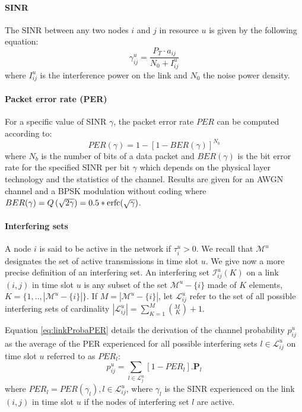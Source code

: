 \documentclass[a4paper]{article}
\newcommand{\power}{P_T}
\newcommand{\M}{\mathcal{M}}
\begin{document}
\paragraph*{SINR}
The SINR between any two nodes $i$ and $j$ in resource $u$ is given by the following equation:
\begin{equation}
\gamma_{ij}^u=\displaystyle{\frac{\power \cdot a_{ij}}{N_0+I_{ij}^u}}
\label{eq:sinr}
\end{equation}
where $I_{ij}^u$ is the interference power on the link and $N_0$ the noise power density.

\paragraph*{Packet error rate (PER)}
For a specific value of SINR $\gamma$, the packet error rate $PER$ can be computed according to:
\begin{equation}
PER(\gamma) = 1-\left[1-BER(\gamma)\right]^{N_b} 
\label{eq:PER}
\end{equation}
\noindent where $N_b$ is the number of bits of a data packet and $BER(\gamma)$ is the bit error rate for the specified SINR per bit $\gamma$ which depends on the physical layer technology and the statistics of the channel.
Results are given for an AWGN channel and a BPSK modulation without coding where $BER(\gamma)= Q\left( \sqrt{2\gamma}\right)= 0.5 *{\rm erfc}(\sqrt{\gamma})$.

\paragraph*{Interfering sets}
A node $i$ is said to be active in the network if $\tau_i^u>0$. We recall that $\M^u$ designates the set of active transmissions in time slot $u$. 
We give now a more precise definition of an interfering set. An interfering set $\mathcal{I}_{ij}^u(K)$ on a link $(i,j)$ in time slot $u$ is any subset of the set $\M^u-\{i\}$ made of $K$ elements, $K = \{1, .., |\M^u-\{i\}|\}$.
If $M=|\M^u-\{i\}|$, let $\mathcal{L}_{ij}^u$ refer to the set of all possible interfering sets of cardinality $|\mathcal{L}_{ij}^u|=\sum_{K=1}^{M}\left(^{M}_{~K}\right)+1$.

\vspace{\baselineskip}

Equation \eqref{eq:linkProbaPER} details the derivation of the channel probability $p_{ij}^u$ as the average of the PER experienced for all possible interfering sets $l \in \mathcal{L}_{ij}^u$ on time slot $u$ referred to as $PER_l$:
\begin{equation}
p_{ij}^u = \sum_{l \in \mathcal{L}_j^u} \left[ 1-PER_l\right].\mathbf{P}_l 
\label{eq:linkProbaPER}
\end{equation}
\noindent where $PER_l = PER(\gamma_l), l \in \mathcal{L}_{ij}^u$, where $\gamma_l$ is the SINR experienced on the link $(i,j)$ in time slot $u$ if the nodes of interfering set $l$ are active.  
\end{document}
